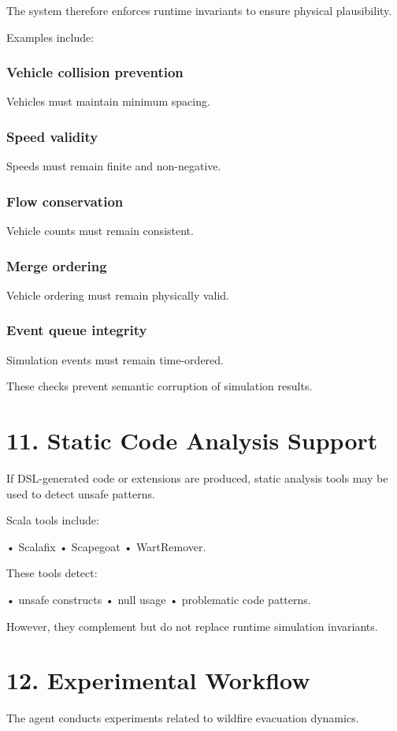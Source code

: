 The system therefore enforces runtime invariants to ensure physical plausibility.

Examples include:

\subsection*{Vehicle collision prevention}
Vehicles must maintain minimum spacing.

\subsection*{Speed validity}
Speeds must remain finite and non-negative.

\subsection*{Flow conservation}
Vehicle counts must remain consistent.

\subsection*{Merge ordering}
Vehicle ordering must remain physically valid.

\subsection*{Event queue integrity}
Simulation events must remain time-ordered.

These checks prevent semantic corruption of simulation results.

\chapter*{11. Static Code Analysis Support}
If DSL-generated code or extensions are produced, static analysis tools may be used to detect unsafe patterns.

Scala tools include:

• Scalafix
• Scapegoat
• WartRemover.

These tools detect:

• unsafe constructs
• null usage
• problematic code patterns.

However, they complement but do not replace runtime simulation invariants.

\chapter*{12. Experimental Workflow}
The agent conducts experiments related to wildfire evacuation dynamics.

